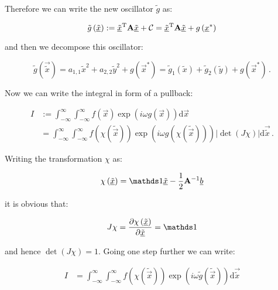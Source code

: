 \documentclass[a4paper,10pt]{article}
\begin{document}
Therefore we can write the new oscillator $\tilde{g}$ as:

\begin{equation}
 \tilde{g}\left(\underline{\tilde{x}}\right)
 := \underline{\tilde{x}}{}^{\textnormal{T}} \mathbf{A} \underline{\tilde{x}} + \mathcal{C}
 =  \underline{\tilde{x}}{}^{\textnormal{T}} \mathbf{A} \underline{\tilde{x}} + g\left(\underline{x}^{*}\right)
\end{equation}

and then we decompose this oscillator:

\begin{equation}
 \tilde{g}(\vec{\tilde{x}}) = a_{1,1} \tilde{x}^2 + a_{2,2} \tilde{y}^2 + g\left(\vec{x}^{*}\right)
                            = \tilde{g}_1(\tilde{x}) + \tilde{g}_2(\tilde{y}) + g\left(\vec{x}^{*}\right) \,.
\end{equation}

Now we can write the integral in form of a pullback:

\begin{equation}
\begin{split}
 I & := \int_{-\infty}^{\infty} \int_{-\infty}^{\infty} f(\vec{x})
          \exp\left(i \omega g(\vec{x})\right) \mathrm{d}\vec{x} \\
   &  = \int_{-\infty}^{\infty} \int_{-\infty}^{\infty}
          f\left(\chi\left(\tilde{\vec{x}}\right)\right)
          \exp\left(i \omega g\left(\chi\left(\tilde{\vec{x}}\right)\right)\right)
          |\det(J\chi)|
        \mathrm{d}\vec{\tilde{x}} \,.
\end{split}
\end{equation}

Writing the transformation $\chi$ as:

\begin{equation}
 \chi\left(\vec{\tilde{x}}\right) = \id \vec{\tilde{x}} -\frac{1}{2} \mat{A}\inv \vec{b}
\end{equation}

it is obvious that:

\begin{equation}
 J\chi = \pdiff{\chi\left(\vec{\tilde{x}}\right)}{\vec{\tilde{x}}} = \id
\end{equation}

and hence $\det(J\chi) = 1$. Going one step further we can write:

\begin{equation}
\begin{split}
 I & = \int_{-\infty}^{\infty} \int_{-\infty}^{\infty}
         f\left(\chi\left(\tilde{\vec{x}}\right)\right)
         \exp\left(i \omega \tilde{g}\left(\tilde{\vec{x}}\right)\right)
       \mathrm{d}\vec{\tilde{x}}
\end{split}
\end{equation}
\end{document}
